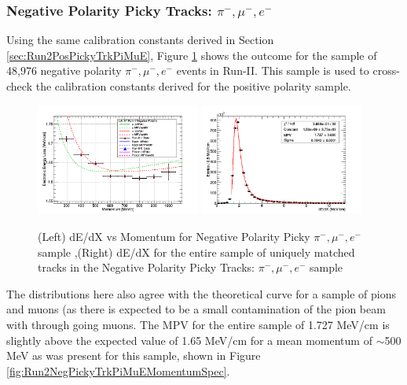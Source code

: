 \clearpage

\subsubsection{Negative Polarity Picky Tracks: $\pi^{-}, \mu^{-}, e^{-}$}\label{sec:Run2NegPickyTrkPiMuE}

Using the same calibration constants derived in Section \ref{sec:Run2PosPickyTrkPiMuE}, Figure \ref{fig:Run2NegPickyTrkPiMuEResults} shows the outcome for the sample of 48,976 negative polarity $\pi^{-}, \mu^{-}, e^{-}$ events in Run-II. This sample is used to cross-check the calibration constants derived for the positive polarity sample.

\begin{figure}[htb]
\centering
\includegraphics[width=0.48\textwidth]{images/dEdXvsMomentumNegPolRun2FineBin.png}
\includegraphics[width=0.48\textwidth]{images/dEdXNegPolRun2.png}
\caption{(Left) dE/dX vs Momentum for Negative Polarity Picky $\pi^{-}, \mu^{-}, e^{-}$ sample ,(Right) dE/dX for the entire sample of uniquely matched tracks in the Negative Polarity Picky Tracks: $\pi^{-}, \mu^{-}, e^{-}$ sample }
\label{fig:Run2NegPickyTrkPiMuEResults}
\end{figure}

The distributions here also agree with the theoretical curve for a sample of pions and muons (as there is expected to be a small contamination of the pion beam with through going muons. The MPV for the entire sample of 1.727 MeV/cm is slightly above the expected value of 1.65 MeV/cm for a mean momentum of $\sim$500 MeV as was present for this sample, shown in Figure \ref{fig:Run2NegPickyTrkPiMuEMomentumSpec}.

